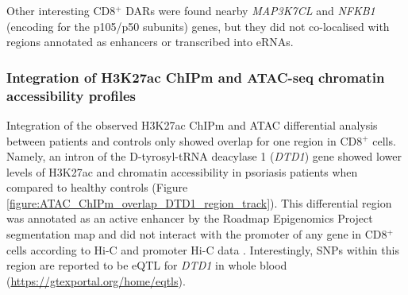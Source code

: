 Other interesting CD8$^+$ DARs were found nearby \textit{MAP3K7CL} and \textit{NFKB1} (encoding for the p105/p50 subunits) genes, but they did not co-localised with regions annotated as enhancers or transcribed into eRNAs.


\subsubsection{Integration of H3K27ac ChIPm and ATAC-seq chromatin accessibility profiles}

Integration of the observed H3K27ac ChIPm and ATAC differential analysis between patients and controls only showed overlap for one region in CD8$^+$ cells. Namely, an intron of the D-tyrosyl-tRNA deacylase 1 (\textit{DTD1}) gene showed lower levels of H3K27ac and chromatin accessibility in psoriasis patients when compared to healthy controls (Figure \ref{figure:ATAC_ChIPm_overlap_DTD1_region_track}). This differential region was annotated as an active enhancer by the Roadmap Epigenomics Project segmentation map and did not interact with the promoter of any gene in CD8$^+$ cells according to Hi-C and promoter Hi-C  data \parencite{Javierre2016}. Interestingly, SNPs within this region are reported to be eQTL for \textit{DTD1} in whole blood (\url{https://gtexportal.org/home/eqtls}). 

